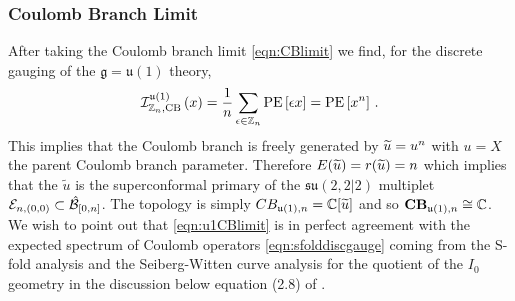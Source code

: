 \documentclass[main.tex]{subfiles}
\begin{document}
\subsubsection{Coulomb Branch Limit}
After taking the Coulomb branch limit \eqref{eqn:CBlimit} we find, for the discrete gauging of the $\mathfrak{g}=\mathfrak{u}(1)$ theory,
\begin{equation}\label{eqn:u1CBlimit}
\mathcal{I}^{\mathfrak{u}(1)}_{\mathbb{Z}_{n},\text{CB}}\left(x\right)=\frac{1}{{n}}\sum_{\epsilon\in\mathbb{Z}_{n}}\operatorname{\mathrm{PE}}\left[\epsilon x\right]=\operatorname{\mathrm{PE}}\left[x^{n}\right]\,.
\end{equation}
This implies that the Coulomb branch is freely generated by $\widetilde{u}=u^{n}$ with $u=X$ the parent Coulomb branch parameter. Therefore $E(\widetilde{u})=r(\widetilde{u})={n}$ which implies that the $\widetilde{u}$ is the superconformal primary of the $\mathfrak{su}(2,2|2)$ multiplet $\mathcal{E}_{{n},(0,0)}\subset \hat{\mathcal{B}}_{[0,{n}]}$. The topology is simply $CB_{\mathfrak{u}(1),n}=\mathbb{C}[\widetilde{u}]$ and so $\mathbf{CB}_{\mathfrak{u}(1),n}\cong\mathbb{C}$. We wish to point out that \eqref{eqn:u1CBlimit} is in perfect agreement with the expected spectrum of Coulomb operators \eqref{eqn:sfolddiscgauge} coming from the S-fold analysis \cite{Aharony:2016kai} and the Seiberg-Witten curve analysis for the quotient of the $I_{0}$ geometry in the discussion below equation (2.8) of \cite{Argyres:2016yzz}.
\end{document}

